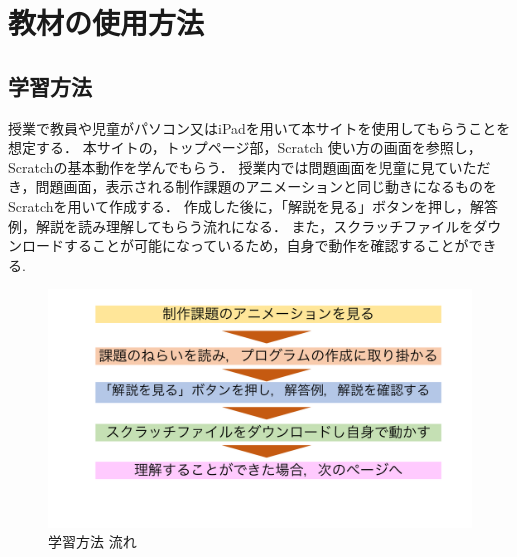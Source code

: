 \clearpage

\section{\rm 教材の使用方法}

\subsection{学習方法}
授業で教員や児童がパソコン又はiPadを用いて本サイトを使用してもらうことを想定する．
本サイトの，トップページ部，Scratch 使い方の画面を参照し，Scratchの基本動作を学んでもらう．
授業内では問題画面を児童に見ていただき，問題画面，表示される制作課題のアニメーションと同じ動きになるものをScratchを用いて作成する．
作成した後に，「解説を見る」ボタンを押し，解答例，解説を読み理解してもらう流れになる．
また，スクラッチファイルをダウンロードすることが可能になっているため，自身で動作を確認することができる.
\begin{figure}[h]
\begin{center}
\includegraphics[width=15cm]{gakushuu.pdf}
\caption{学習方法 流れ}
\label{fig:houhou}
\end{center}
\end{figure}
